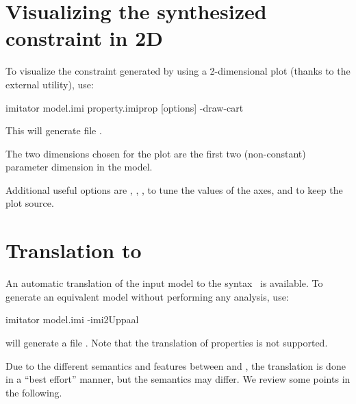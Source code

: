 \section{Visualizing the synthesized constraint in 2D}

To visualize the constraint generated by \imitator{} using a 2-dimensional plot (thanks to the external  utility), use:

\begin{terminal}
imitator model.imi property.imiprop [options] -draw-cart
\end{terminal}

This will generate file .

The two dimensions chosen for the plot are the first two (non-constant) parameter dimension in the model.

Additional useful options are
,
,
,
to tune the values of the axes,
and  to keep the plot source.


\section{Translation to \uppaal{}}\label{section:uppaal}

An automatic translation of the input model to the \uppaal{} syntax~\cite{LPY97} is available.
To generate an equivalent \uppaal{} model without performing any analysis, use:

\begin{terminal}
imitator model.imi -imi2Uppaal
\end{terminal}

\imitator{} will generate a file .
Note that the translation of properties is not supported.

Due to the different semantics and features between \imitator{} and \uppaal{}, the translation is done in a ``best effort'' manner, but the semantics may differ.
We review some points in the following.

